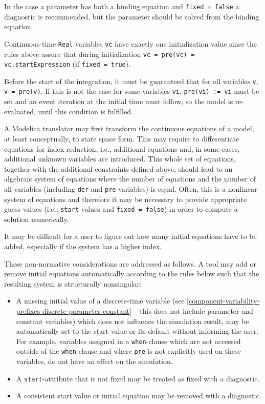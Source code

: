 \begin{nonnormative}
In the case a parameter has both a binding equation and \lstinline!fixed = false! a diagnostic is recommended, but the parameter should be solved from the binding equation.

Continuous-time \lstinline!Real! variables \lstinline!vc! have exactly one initialization value since the rules above assure that during initialization \lstinline!vc = pre(vc) = vc.startExpression! (if \lstinline!fixed = true!).

Before the start of the integration, it must be guaranteed that for all variables \lstinline!v!, \lstinline!v = pre(v)!.
If this is not the case for some variables \lstinline!vi!, \lstinline!pre(vi) := vi! must be set and an event iteration at the initial time must follow, so the model is re-evaluated, until this condition is fulfilled.

A Modelica translator may first transform the continuous equations of a model, at least conceptually, to state space form.
This may require to differentiate equations for index reduction, i.e., additional equations and, in some cases, additional unknown variables are introduced.
This whole set of equations, together with the additional constraints defined above, should lead to an algebraic system of equations where the number of equations and the number of all variables (including \lstinline!der! and \lstinline!pre! variables) is equal.
Often, this is a nonlinear system of equations and therefore it may be necessary to provide appropriate guess values (i.e., \lstinline!start! values and \lstinline!fixed = false!) in order to compute a solution numerically.

It may be difficult for a user to figure out how many initial equations have to be added, especially if the system has a higher index.
\end{nonnormative}

These non-normative considerations are addressed as follows.
A tool may add or remove initial equations automatically according to the rules below such that the resulting system is structurally nonsingular:
\begin{itemize}
\item A missing initial value of a discrete-time variable (see \cref{component-variability-prefixes-discrete-parameter-constant} -- this does not include parameter and constant variables) which does not influence the simulation result, may be automatically set to the start value or its default without informing the user.
For example, variables assigned in a \lstinline!when!-clause which are not accessed outside of the \lstinline!when!-clause and where \lstinline!pre! is not explicitly used on these variables, do not have an effect on the simulation.
\item A \lstinline!start!-attribute that is not fixed may be treated as fixed with a diagnostic.
\item A consistent start value or initial equation may be removed with a diagnostic.
\end{itemize}

